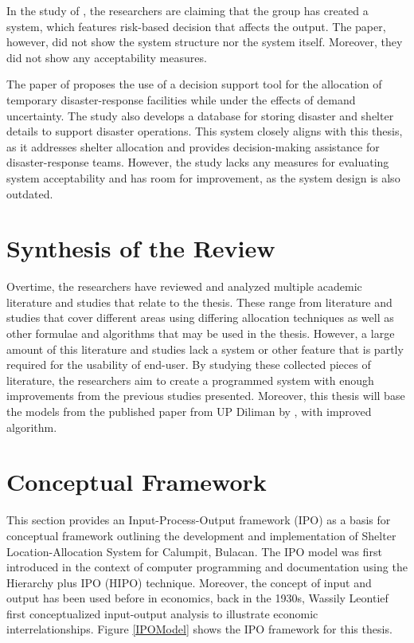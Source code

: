 	In the study of \textcite{Amir2023}, the researchers are claiming that the group has created a system, which features risk-based decision that affects the output. The paper, however, did not show the system structure nor the system itself. Moreover, they did not show any acceptability measures.
	
	 The paper of \textcite{Cavdur2019} proposes the use of a decision support tool for the allocation of temporary disaster-response facilities while under the effects of demand uncertainty. The study also develops a database for storing disaster and shelter details to support disaster operations. This system closely aligns with this thesis, as it addresses shelter allocation and provides decision-making assistance for disaster-response teams. However, the study lacks any measures for evaluating system acceptability and has room for improvement, as the system design is also outdated.

\section{Synthesis of the Review}
	Overtime, the researchers have reviewed and analyzed multiple academic literature and studies that relate to the thesis. These range from literature and studies that cover different areas using differing allocation techniques as well as other formulae and algorithms that may be used in the thesis. However, a large amount of this literature and studies lack a system or other feature that is partly required for the usability of end-user. By studying these collected pieces of literature, the researchers aim to create a programmed system with enough improvements from the previous studies presented. Moreover, this thesis will base the models from the published paper from UP Diliman by \textcite{LeahUP}, with improved algorithm.

\section{Conceptual Framework}
	This section provides an Input-Process-Output framework (IPO) as a basis for conceptual framework outlining the development and implementation of Shelter Location-Allocation System for Calumpit, Bulacan. The IPO model was first introduced in the context of computer programming and documentation using the Hierarchy plus IPO (HIPO) technique. Moreover, the concept of input and output has been used before in economics, back in the 1930s, Wassily Leontief first conceptualized input-output analysis to illustrate economic interrelationships. Figure \ref{IPOModel} shows the IPO framework for this thesis.
	
